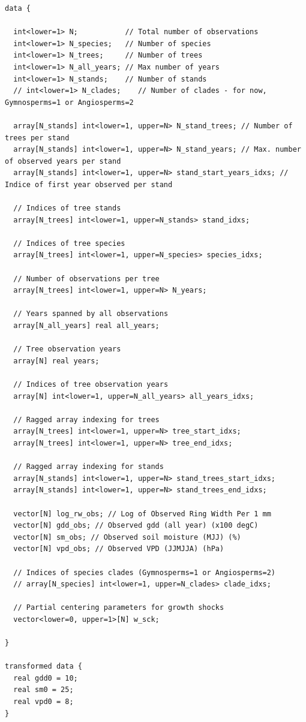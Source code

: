 \documentclass[
  letterpaper,
  DIV=11,
  numbers=noendperiod]{scrartcl}
\begin{document}
\begin{verbatim}
data {
  
  int<lower=1> N;           // Total number of observations
  int<lower=1> N_species;   // Number of species
  int<lower=1> N_trees;     // Number of trees
  int<lower=1> N_all_years; // Max number of years
  int<lower=1> N_stands;    // Number of stands
  // int<lower=1> N_clades;    // Number of clades - for now, Gymnosperms=1 or Angiosperms=2
  
  array[N_stands] int<lower=1, upper=N> N_stand_trees; // Number of trees per stand
  array[N_stands] int<lower=1, upper=N> N_stand_years; // Max. number of observed years per stand
  array[N_stands] int<lower=1, upper=N> stand_start_years_idxs; // Indice of first year observed per stand
  
  // Indices of tree stands
  array[N_trees] int<lower=1, upper=N_stands> stand_idxs;
  
  // Indices of tree species
  array[N_trees] int<lower=1, upper=N_species> species_idxs;
  
  // Number of observations per tree
  array[N_trees] int<lower=1, upper=N> N_years;
  
  // Years spanned by all observations
  array[N_all_years] real all_years;
  
  // Tree observation years
  array[N] real years;
  
  // Indices of tree observation years
  array[N] int<lower=1, upper=N_all_years> all_years_idxs;
  
  // Ragged array indexing for trees
  array[N_trees] int<lower=1, upper=N> tree_start_idxs;
  array[N_trees] int<lower=1, upper=N> tree_end_idxs;
  
  // Ragged array indexing for stands
  array[N_stands] int<lower=1, upper=N> stand_trees_start_idxs;
  array[N_stands] int<lower=1, upper=N> stand_trees_end_idxs;
  
  vector[N] log_rw_obs; // Log of Observed Ring Width Per 1 mm
  vector[N] gdd_obs; // Observed gdd (all year) (x100 degC)
  vector[N] sm_obs; // Observed soil moisture (MJJ) (%)
  vector[N] vpd_obs; // Observed VPD (JJMJJA) (hPa)
  
  // Indices of species clades (Gymnosperms=1 or Angiosperms=2)
  // array[N_species] int<lower=1, upper=N_clades> clade_idxs;
  
  // Partial centering parameters for growth shocks
  vector<lower=0, upper=1>[N] w_sck;
  
}

transformed data {
  real gdd0 = 10;
  real sm0 = 25;
  real vpd0 = 8;
}


\end{verbatim}
\end{document}
